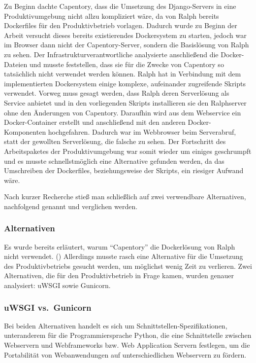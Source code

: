 Zu Beginn dachte Capentory, dass die Umsetzung des Django-Servers in
eine Produktivumgebung nicht allzu kompliziert wäre, da von Ralph
bereits Dockerfiles für den Produktivbetrieb vorlagen. Dadurch wurde zu
Beginn der Arbeit versucht dieses bereits existierendes Dockersystem zu
starten, jedoch war im Browser dann nicht der Capentory-Server, sondern
die Basislösung von Ralph zu sehen. Der Infrastrukturverantwortliche
analysierte anschließend die Docker-Dateien und musste feststellen, dass
sie für die Zwecke von Capentory so tatsächlich nicht verwendet werden
können. Ralph hat in Verbindung mit dem implementierten Dockersystem
einige komplexe, aufeinander zugreifende Skripts verwendet. Vorweg muss
gesagt werden, dass Ralph deren Serverlösung als Service anbietet und in
den vorliegenden Skripts installieren sie den Ralphserver ohne den
Änderungen von Capentory. Daraufhin wird aus dem Webservice ein
Docker-Container erstellt und anschließend mit den anderen
Docker-Komponenten hochgefahren. Dadurch war im Webbrowser beim
Serverabruf, statt der gewollten Serverlösung, die falsche zu sehen. Der
Fortschritt des Arbeitspaketes der Produktivumgebung war somit wieder um
einiges geschrumpft und es musste schnellstmöglich eine Alternative
gefunden werden, da das Umschreiben der Dockerfiles, beziehungsweise der
Skripts, ein riesiger Aufwand wäre.

Nach kurzer Recherche stieß man schließlich auf zwei verwendbare
Alternativen, nachfolgend genannt und verglichen werden.

\hypertarget{alternativen}{%
\subsubsection{Alternativen}\label{alternativen}}

Es wurde bereits erläutert, warum ``Capentory'' die Dockerlösung von
Ralph nicht verwendet. ()
Allerdings musste rasch eine Alternative für die Umsetzung des
Produktivbetriebs gesucht werden, um möglichst wenig Zeit zu verlieren.
Zwei Alternativen, die für den Produktivbetrieb in Frage kamen, wurden
genauer analysiert: uWSGI sowie Gunicorn.

\hypertarget{uwsgi-vs.-gunicorn}{%
\subsubsection{uWSGI vs.~Gunicorn}\label{uwsgi-vs.-gunicorn}}

Bei beiden Alternativen handelt es sich um
Schnittstellen-Spezifikationen, unteranderem für die Programmiersprache
Python, die eine Schnittstelle zwischen Webservern und Webframeworks
bzw. Web Application Servern festlegen, um die Portabilität von
Webanwendungen auf unterschiedlichen Webservern zu fördern.

